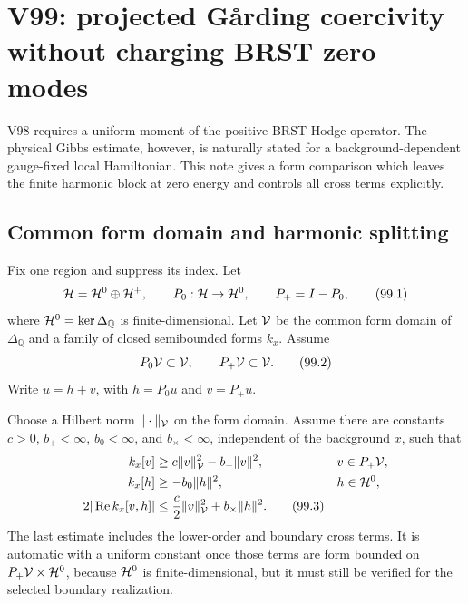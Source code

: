 \documentclass[11pt]{article}
\theoremstyle{remark}
\begin{document}


\section{V99: projected G{\aa}rding coercivity without charging BRST
zero modes}
\label{sec:v12v99}

V98 requires a uniform moment of the positive BRST-Hodge operator.
The physical Gibbs estimate, however, is naturally stated for a
background-dependent gauge-fixed local Hamiltonian.  This note gives
a form comparison which leaves the finite harmonic block at zero
energy and controls all cross terms explicitly.

\subsection{Common form domain and harmonic splitting}

Fix one region and suppress its index.  Let
\[
 {\cal H}={\cal H}^0\oplus{\cal H}^+,\qquad
 P_0:{\cal H}\to{\cal H}^0,\qquad P_+=I-P_0,                    \tag{99.1}
\]
where \({\cal H}^0=\ker\Delta_{\mathbb Q}\) is finite-dimensional.
Let \({\cal V}\) be the common form domain of
\(\Delta_{\mathbb Q}\) and a family of closed semibounded forms
\(k_x\).  Assume
\[
 P_0{\cal V}\subset{\cal V},\qquad P_+{\cal V}\subset{\cal V}.    \tag{99.2}
\]
Write \(u=h+v\), with \(h=P_0u\) and \(v=P_+u\).

Choose a Hilbert norm \(\|\cdot\|_{\cal V}\) on the form domain.
Assume there are constants \(c>0\), \(b_+<\infty\),
\(b_0<\infty\), and \(b_\times<\infty\), independent of the
background \(x\), such that
\[
 \begin{split}
 k_x[v]&\geq c\|v\|_{\cal V}^2-b_+\|v\|^2,
 &&v\in P_+{\cal V},\\
 k_x[h]&\geq-b_0\|h\|^2,
 &&h\in{\cal H}^0,\\
 2|\operatorname{Re}k_x[v,h]|
 &\leq\frac c2\|v\|_{\cal V}^2+b_\times\|h\|^2.
                                                                    \tag{99.3}
 \end{split}
\]
The last estimate includes the lower-order and boundary cross
terms.  It is automatic with a uniform constant once those terms
are form bounded on \(P_+{\cal V}\times{\cal H}^0\), because
\({\cal H}^0\) is finite-dimensional, but it must still be verified
for the selected boundary realization.
\end{document}
